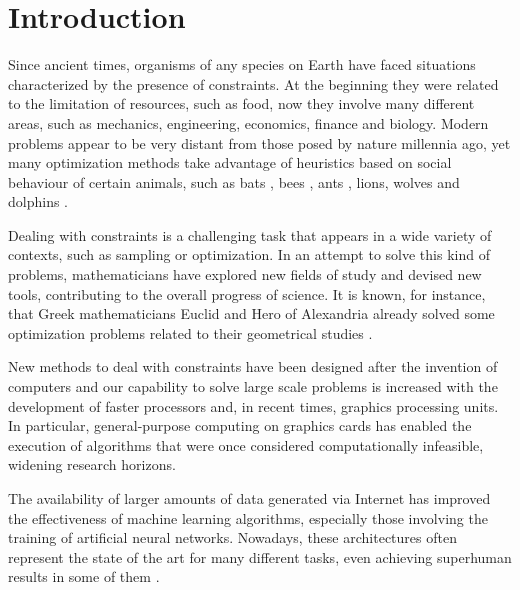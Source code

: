 \chapter{Introduction}


% 

Since ancient times, organisms of any species on Earth have faced situations characterized by the presence of constraints. At the beginning they were related to the limitation of resources, such as food, now they involve many different areas, such as mechanics, engineering, economics, finance and biology. Modern problems appear to be very distant from those posed by nature millennia ago, yet many optimization methods take advantage of heuristics based on social behaviour of certain animals, such as bats \cite{bats}, bees \cite{bees}, ants \cite{ants}, lions, wolves and dolphins \cite{group_hunting}.

Dealing with constraints is a challenging task that appears in a wide variety of contexts, such as sampling or optimization. In an attempt to solve this kind of problems, mathematicians have explored new fields of study and devised new tools, contributing to the overall progress of science. It is known, for instance, that Greek mathematicians Euclid and Hero of Alexandria already solved some optimization problems related to their geometrical studies \cite{euclid}\cite{hero}.

New methods to deal with constraints have been designed after the invention of computers and our capability to solve large scale problems is increased with the development of faster processors and, in recent times, graphics processing units. In particular, general-purpose computing on graphics cards has enabled the execution of algorithms that were once considered computationally infeasible, widening research horizons.

The availability of larger amounts of data generated via Internet has improved the effectiveness of machine learning algorithms, especially those involving the training of artificial neural networks. Nowadays, these architectures often represent the state of the art for many different tasks, even achieving superhuman results in some of them \cite{888}.

